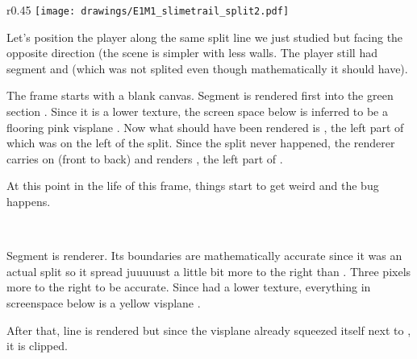 \begin{minipage}{0.47\textwidth}
\end{minipage}
\hspace{4mm}
\begin{minipage}{0.47\textwidth}
\end{minipage} 
\par
\vspace{1mm}
\par



\par
\begin{wrapfigure}[23]{r}{0.45\textwidth}
\centering
\texttt{[image: drawings/E1M1\_slimetrail\_split2.pdf]}
\end{wrapfigure}
Let's position the player along the same split line we just studied but facing the opposite direction (the scene is simpler with less walls. The player still had segment  and  (which was not splited even though mathematically it should have).\\
\par
The frame starts with a blank canvas. Segment  is rendered first into the green section . Since it is a lower texture, the screen space below is inferred to be a flooring pink visplane . Now what should have been rendered is , the left part of  which was on the left of the split. Since the split never happened, the renderer carries on (front to back) and renders , the left part of .\\
\par
At this point in the life of this frame, things start to get weird and the bug happens.
 

\\
\par
Segment  is renderer. Its boundaries are mathematically accurate since it was an actual split so it spread juuuuust a little bit more to the right than  . Three pixels more to the right to be accurate. Since  had a lower texture, everything in screenspace below  is a yellow visplane .\\
 \par
 After that, line  is rendered but since the visplane already squeezed itself next to , it is clipped.\\
 \par
 
